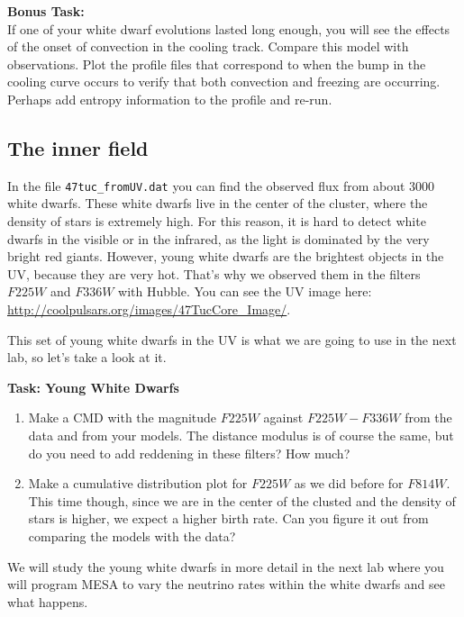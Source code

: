 \documentclass{article}
\begin{document}
\textbf{Bonus Task:}\\
If one of your white dwarf evolutions lasted long enough, you will see the effects of the onset of convection in the cooling track.  Compare this model with observations.   Plot the profile files that correspond to when the bump in the cooling curve occurs to verify that both convection and freezing are occurring.   Perhaps add entropy information to the profile and re-run. 


\subsection{The inner field}

In the file \texttt{47tuc\_fromUV.dat} you can find the observed flux from about 3000 white dwarfs. These white dwarfs live in the center of the cluster, where the density of stars is extremely high. For this reason, it is hard to detect white dwarfs in the visible or in the infrared, as the light is dominated by the very bright red giants. However, young white dwarfs are the brightest objects in the UV, because they are very hot. That's why we observed them in the filters $F225W$ and $F336W$ with Hubble. You can see the UV image here: \url{http://coolpulsars.org/images/47TucCore_Image/}.

This set of young white dwarfs in the UV is what we are going to use in the next lab, so let's take a look at it.

\textbf{Task: Young White Dwarfs}\vspace{-1em}
\begin{enumerate}
 \setlength\itemsep{0em}
\item Make a CMD with the magnitude $F225W$ against $F225W-F336W$ from the data and from your models. The distance modulus is of course the same, but do you need to add reddening in these filters? How much?
\item Make a cumulative distribution plot for $F225W$ as we did before for $F814W$. This time though, since we are in the center of the clusted and the density of stars is higher, we expect a higher birth rate. Can you figure it out from comparing the models with the data?
\end{enumerate}

We will study the young white dwarfs in more detail in the next lab where you will program MESA to vary the neutrino rates within the white dwarfs and see what happens.
\end{document}
